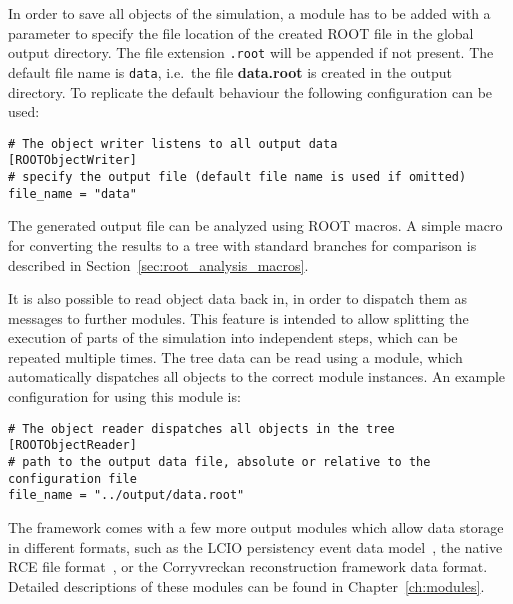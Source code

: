 In order to save all objects of the simulation, a  module has to be added with a  parameter to specify the file location of the created ROOT file in the global output directory.
The file extension \texttt{.root} will be appended if not present.
The default file name is \texttt{data}, i.e.\ the file \textbf{data.root} is created in the output directory.
To replicate the default behaviour the following configuration can be used:
\begin{verbatim}
# The object writer listens to all output data
[ROOTObjectWriter]
# specify the output file (default file name is used if omitted)
file_name = "data"
\end{verbatim}
The generated output file can be analyzed using ROOT macros.
A simple macro for converting the results to a tree with standard branches for comparison is described in Section~\ref{sec:root_analysis_macros}.

It is also possible to read object data back in, in order to dispatch them as messages to further modules.
This feature is intended to allow splitting the execution of parts of the simulation into independent steps, which can be repeated multiple times.
The tree data can be read using a  module, which automatically dispatches all objects to the correct module instances.
An example configuration for using this module is:
\begin{verbatim}
# The object reader dispatches all objects in the tree
[ROOTObjectReader]
# path to the output data file, absolute or relative to the configuration file
file_name = "../output/data.root"
\end{verbatim}

The \apsq framework comes with a few more output modules which allow data storage in different formats, such as the LCIO persistency event data model~\cite{lcio}, the native RCE file format~\cite{rce}, or the Corryvreckan reconstruction framework data format.
Detailed descriptions of these modules can be found in Chapter~\ref{ch:modules}.
